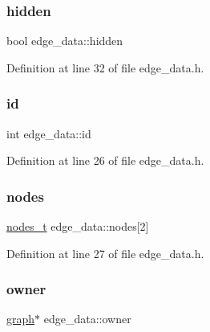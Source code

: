 \mbox{\label{classedge__data_af8dc68051e5fe3336aa31ae1f3e104c3}} 
\subsubsection{\texorpdfstring{hidden}{hidden}}
{\footnotesize\ttfamily bool edge\+\_\+data\+::hidden}



Definition at line 32 of file edge\+\_\+data.\+h.

\mbox{\label{classedge__data_a33597ce417f8d86697b03fc8b6fea526}} 
\subsubsection{\texorpdfstring{id}{id}}
{\footnotesize\ttfamily int edge\+\_\+data\+::id}



Definition at line 26 of file edge\+\_\+data.\+h.

\mbox{\label{classedge__data_a870bbbb05de6c5f63d434db624c55dd4}} 
\subsubsection{\texorpdfstring{nodes}{nodes}}
{\footnotesize\ttfamily \mbox{\hyperlink{edge_8h_a22ac17689106ba21a84e7bc54d1199d6}{nodes\+\_\+t}} edge\+\_\+data\+::nodes\mbox{[}2\mbox{]}}



Definition at line 27 of file edge\+\_\+data.\+h.

\mbox{\label{classedge__data_a00436f2956a69cd9dc8e5bfa530e0ce9}} 
\subsubsection{\texorpdfstring{owner}{owner}}
{\footnotesize\ttfamily \mbox{\hyperlink{classgraph}{graph}}$\ast$ edge\+\_\+data\+::owner}



